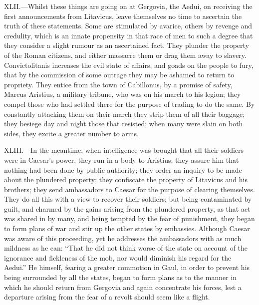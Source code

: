 XLII.—Whilst these things are going on at Gergovia, the Aedui, on
receiving the first announcements from Litavicus, leave themselves no
time to ascertain the truth of these statements. Some are stimulated by
avarice, others by revenge and credulity, which is an innate propensity
in that race of men to such a degree that they consider a slight rumour
as an ascertained fact. They plunder the property of the Roman citizens,
and either massacre them or drag them away to slavery. Convictolitanis
increases the evil state of affairs, and goads on the people to fury,
that by the commission of some outrage they may be ashamed to return to
propriety. They entice from the town of Cabillonus, by a promise of
safety, Marcus Aristius, a military tribune, who was on his march to his
legion; they compel those who had settled there for the purpose of
trading to do the same. By constantly attacking them on their march they
strip them of all their baggage; they besiege day and night those that
resisted; when many were slain on both sides, they excite a greater
number to arms.

XLIII.—In the meantime, when intelligence was brought that all their
soldiers were in Caesar's power, they run in a body to Aristius; they
assure him that nothing had been done by public authority; they order an
inquiry to be made about the plundered property; they confiscate the
property of Litavicus and his brothers; they send ambassadors to Caesar
for the purpose of clearing themselves. They do all this with a view to
recover their soldiers; but being contaminated by guilt, and charmed by
the gains arising from the plundered property, as that act was shared in
by many, and being tempted by the fear of punishment, they began to form
plans of war and stir up the other states by embassies. Although Caesar
was aware of this proceeding, yet he addresses the ambassadors with as
much mildness as he can: ``That he did not think worse of the state on
account of the ignorance and fickleness of the mob, nor would diminish
his regard for the Aedui.'' He himself, fearing a greater commotion in
Gaul, in order to prevent his being surrounded by all the states, began
to form plans as to the manner in which he should return from Gergovia
and again concentrate his forces, lest a departure arising from the fear
of a revolt should seem like a flight.

